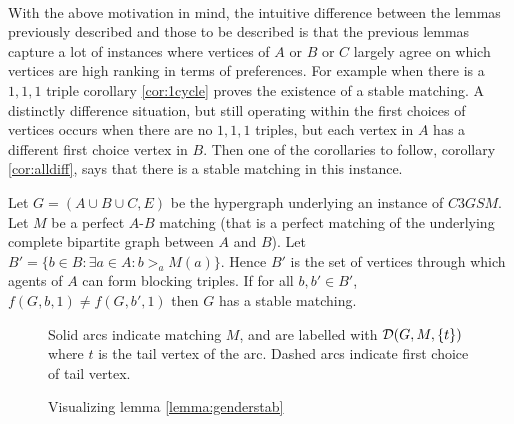\paragraph{}
With the above motivation in mind, the intuitive difference between the lemmas previously described and those to be described is that the previous lemmas capture a lot of instances where vertices of $A$ or $B$ or $C$ largely agree on which vertices are high ranking in terms of preferences. For example when there is a $1,1,1$ triple corollary \ref{cor:1cycle} proves the existence of a stable matching. A distinctly difference situation, but still operating within the first choices of vertices occurs when there are no $1,1,1$ triples, but each vertex in $A$ has a different first choice vertex in $B$. Then one of the corollaries to follow, corollary \ref{cor:alldiff}, says that there is a stable matching in this instance.
\begin{lemma}\label{lemma:genderstab}
Let $G=(A\cup B\cup C, E)$ be the hypergraph underlying an instance of $C3GSM$. Let $M$ be a perfect $A$-$B$ matching (that is a perfect matching of the underlying complete bipartite graph between $A$ and $B$). Let $B' = \{ b \in B : \exists a \in A : b >_a M(a) \}$. Hence $B'$ is the set of vertices through which agents of $A$ can form blocking triples. If for all $b, b' \in B'$, $f(G,b,1) \neq f(G,b',1)$ then $G$ has a stable matching.
\end{lemma}
\begin{figure}[h]
\centering
{}
\caption{Visualizing lemma \ref{lemma:genderstab}}
\small
\begin{flushleft}
Solid arcs indicate matching $M$, and are labelled with $\mathcal{D}(G,M,\{t\})$ where $t$ is the tail vertex of the arc. Dashed arcs indicate first choice of tail vertex.
\end{flushleft}
\end{figure}
